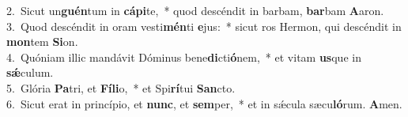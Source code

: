 {2.~}Sicut un\textbf{guén}tum in \textbf{cá}\textbf{pi}te,~* quod descéndit in barbam, \textbf{bar}bam \textbf{A}aron.\\
{3.~}Quod descéndit in oram vesti\textbf{mén}ti \textbf{e}jus:~* sicut ros Hermon, qui descéndit in \textbf{mon}tem \textbf{Si}on.\\
{4.~}Quóniam illic mandávit Dóminus bene\textbf{di}cti\textbf{ó}nem,~* et vitam \textbf{us}que in \textbf{sǽ}culum.\\
{5.~}Glória \textbf{Pa}tri, et \textbf{Fí}\textbf{li}o,~* et Spi\textbf{rí}tui \textbf{San}cto.\\
{6.~}Sicut erat in princípio, et \textbf{nunc}, et \textbf{sem}per,~* et in sǽcula sæcu\textbf{ló}rum. \textbf{A}men.\\
